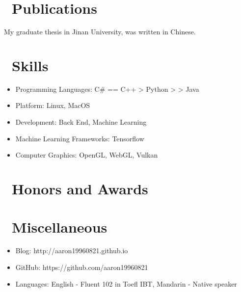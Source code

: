 \documentclass{resume}
\begin{document}
\section{\faCogs\ Publications}
My graduate thesis in Jinan University, was written in Chinese.

\section{\faCogs\ Skills}
\begin{itemize}[parsep=0.5ex]
  \item Programming Languages: C\# == C++ > Python > > Java
  \item Platform: Linux, MacOS
  \item Development: Back End, Machine Learning
  \item Machine Learning Frameworks: Tensorflow
  \item Computer Graphics: OpenGL, WebGL, Vulkan
\end{itemize}

\section{\faHeartO\ Honors and Awards}

\section{\faInfo\ Miscellaneous}
\begin{itemize}[parsep=0.5ex]
  \item Blog: http://aaron19960821.github.io
  \item GitHub: https://github.com/aaron19960821
  \item Languages: English - Fluent 102 in Toefl IBT, Mandarin - Native speaker
\end{itemize}
\end{document}
